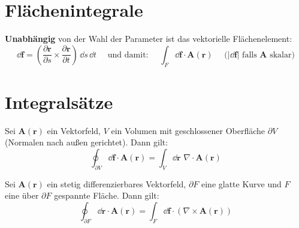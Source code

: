 \section{Flächenintegrale}

\begin{framedprop}
\textbf{Unabhängig} von der Wahl der Parameter ist das vektorielle Flächenelement:
\[
\dd \mathbf{f} = \left(\frac{\partial \mathbf{r}}{\partial s} \times \frac{\partial \mathbf{r}}{\partial t} \right) \, \dd s \, \dd t \quad \textrm{ und damit: } \quad \int_{F} \dd \mathbf{f} \cdot \mathbf{A}(\mathbf{r}) \quad \textrm{ (}|\dd \mathbf{f}|\textrm{ falls }\mathbf{A}\textrm{ skalar)}
\]
\end{framedprop}

\section{Integralsätze}

\begin{framedthm}
	Sei $\mathbf{A}(\mathbf{r})$ ein Vektorfeld, $V$ ein Volumen mit geschlossener Oberfläche $\partial V$ (Normalen nach außen gerichtet). Dann gilt:
	\[
	\oint_{\partial V} \dd \mathbf{f} \cdot \mathbf{A}(\mathbf{r}) = \int_{V} \dd \mathbf{r} \,\, \nabla \cdot \mathbf{A}(\mathbf{r}) 
	\] 
\end{framedthm}

\begin{framedthm}
	Sei $\mathbf{A}(\mathbf{r})$ ein stetig differenzierbares Vektorfeld, $\partial F$ eine glatte Kurve und $F$ eine über $\partial F$ gespannte Fläche. Dann gilt:
	\[
	\oint_{\partial F} \dd \mathbf{r} \cdot \mathbf{A}(\mathbf{r}) = \int_F \dd \mathbf{f} \cdot (\nabla \times \mathbf{A}(\mathbf{r}))
	\]
\end{framedthm}


